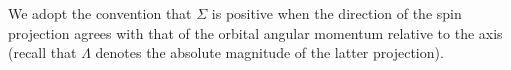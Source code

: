 We adopt the convention that $\Sigma$ is positive when the direction of the spin projection agrees with that of the orbital angular momentum relative to the axis (recall that $\Lambda$ denotes the absolute magnitude of the latter projection).
